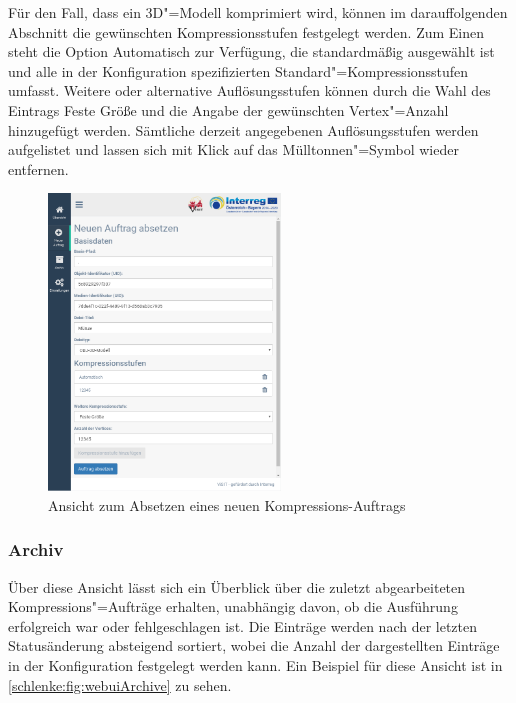 Für den Fall, dass ein 3D"=Modell komprimiert wird, können im darauffolgenden Abschnitt die gewünschten Kompressionsstufen festgelegt werden. Zum Einen steht die Option \glqq{}Automatisch\grqq{} zur Verfügung, die standardmäßig ausgewählt ist und alle in der Konfiguration spezifizierten Standard"=Kompressionsstufen umfasst. Weitere oder alternative Auflösungsstufen können durch die Wahl des Eintrags \glqq{}Feste Größe\grqq{} und die Angabe der gewünschten Vertex"=Anzahl hinzugefügt werden. Sämtliche derzeit angegebenen Auflösungsstufen werden aufgelistet und lassen sich mit Klick auf das Mülltonnen"=Symbol wieder entfernen.

\begin{figure}
\begin{center}
\includegraphics[width=0.55\textwidth]{Figures/schlenker/webui/dispatch2.png}
\caption{Ansicht zum Absetzen eines neuen Kompressions-Auftrags}
\label{schlenke:fig:webuiDispatch}
\end{center}
\end{figure}

\subsubsection{Archiv}

Über diese Ansicht lässt sich ein Überblick über die zuletzt abgearbeiteten Kompressions"=Aufträge erhalten, unabhängig davon, ob die Ausführung erfolgreich war oder fehlgeschlagen ist. Die Einträge werden nach der letzten Statusänderung absteigend sortiert, wobei die Anzahl der dargestellten Einträge in der Konfiguration festgelegt werden kann. Ein Beispiel für diese Ansicht ist in \autoref{schlenke:fig:webuiArchive} zu sehen.


